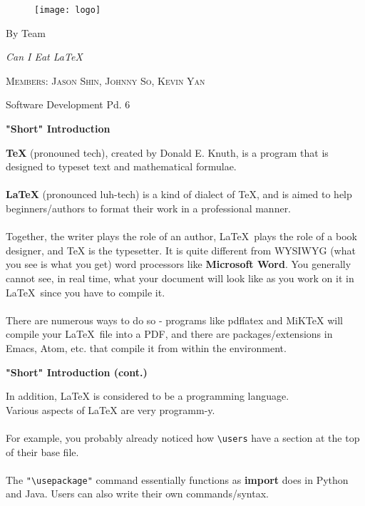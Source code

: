 \documentclass[a4paper,12pt]{article}
\begin{document}
\begin{titlepage}
	\begin{figure}[!ht]
		\centering
			\texttt{[image: logo]}
	\end{figure}
	\vspace{3cm}
	\centering
	{\huge By Team \par}
	\vspace{0.5cm}
	{\huge\itshape Can I Eat LaTeX \par}
	\vspace{2cm}
	{\scshape\Large  Members: Jason Shin, Johnny So, Kevin Yan\par}
	{\large Software Development Pd. 6}
\end{titlepage}
	

\newpage
\begin{center}
  	\bf{\Huge{"Short" Introduction}}
\end{center}
\bigskip
\Large
\textbf{\TeX} (pronouned tech), created by Donald E. Knuth, is a program that is
designed to typeset text and mathematical formulae. \\\\
\textbf{\LaTeX} (pronounced luh-tech) is a kind of dialect of TeX, and is aimed to help beginners/authors to
format their work in a professional manner. \\\\
Together, the writer plays the role of an author, \LaTeX\ plays the role of a book designer, and TeX is the
typesetter. It is quite different from WYSIWYG (what you see is what you get)
word processors like \textbf{Microsoft Word}. You generally cannot see, in real
time, what your document will look like as you work on it in \LaTeX\ since you
have to compile it. \\\\
There are numerous ways to do so - programs like pdflatex and MiKTeX will
compile your \LaTeX\ file into a PDF, and there are packages/extensions in Emacs, Atom, etc. that compile it from within the environment.

\newpage
\begin{center}
	\bf{\Huge{"Short" Introduction (cont.)}}
\end{center}
\bigskip
\Large
In addition, LaTeX is considered to be a programming language. \\
Various aspects of LaTeX are very programm-y. \\\\
For example, you probably already noticed
how \verb|\users| have a section at the top of their base file. \\\\
The \verb|"\usepackage"| command essentially functions as \textbf{import} does
in Python and Java. Users can also write their own commands/syntax.
\end{document}

